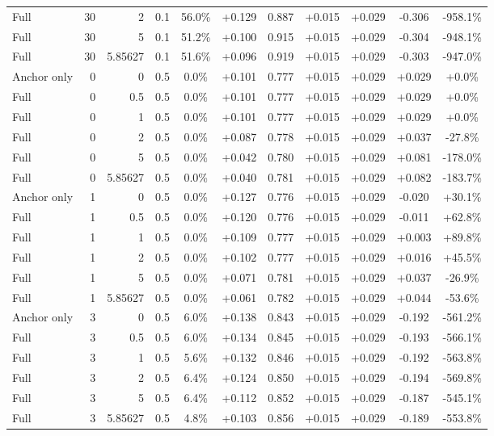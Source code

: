 \begin{table}[htbp]
\begin{tabular}{lrrrccccccc}
Full & 30 & 2 & 0.1 & 56.0\% & +0.129 & 0.887 & +0.015 & +0.029 & -0.306 & -958.1\% \\
Full & 30 & 5 & 0.1 & 51.2\% & +0.100 & 0.915 & +0.015 & +0.029 & -0.304 & -948.1\% \\
Full & 30 & 5.85627 & 0.1 & 51.6\% & +0.096 & 0.919 & +0.015 & +0.029 & -0.303 & -947.0\% \\
Anchor only & 0 & 0 & 0.5 & 0.0\% & +0.101 & 0.777 & +0.015 & +0.029 & +0.029 & +0.0\% \\
Full & 0 & 0.5 & 0.5 & 0.0\% & +0.101 & 0.777 & +0.015 & +0.029 & +0.029 & +0.0\% \\
Full & 0 & 1 & 0.5 & 0.0\% & +0.101 & 0.777 & +0.015 & +0.029 & +0.029 & +0.0\% \\
Full & 0 & 2 & 0.5 & 0.0\% & +0.087 & 0.778 & +0.015 & +0.029 & +0.037 & -27.8\% \\
Full & 0 & 5 & 0.5 & 0.0\% & +0.042 & 0.780 & +0.015 & +0.029 & +0.081 & -178.0\% \\
Full & 0 & 5.85627 & 0.5 & 0.0\% & +0.040 & 0.781 & +0.015 & +0.029 & +0.082 & -183.7\% \\
Anchor only & 1 & 0 & 0.5 & 0.0\% & +0.127 & 0.776 & +0.015 & +0.029 & -0.020 & +30.1\% \\
Full & 1 & 0.5 & 0.5 & 0.0\% & +0.120 & 0.776 & +0.015 & +0.029 & -0.011 & +62.8\% \\
Full & 1 & 1 & 0.5 & 0.0\% & +0.109 & 0.777 & +0.015 & +0.029 & +0.003 & +89.8\% \\
Full & 1 & 2 & 0.5 & 0.0\% & +0.102 & 0.777 & +0.015 & +0.029 & +0.016 & +45.5\% \\
Full & 1 & 5 & 0.5 & 0.0\% & +0.071 & 0.781 & +0.015 & +0.029 & +0.037 & -26.9\% \\
Full & 1 & 5.85627 & 0.5 & 0.0\% & +0.061 & 0.782 & +0.015 & +0.029 & +0.044 & -53.6\% \\
Anchor only & 3 & 0 & 0.5 & 6.0\% & +0.138 & 0.843 & +0.015 & +0.029 & -0.192 & -561.2\% \\
Full & 3 & 0.5 & 0.5 & 6.0\% & +0.134 & 0.845 & +0.015 & +0.029 & -0.193 & -566.1\% \\
Full & 3 & 1 & 0.5 & 5.6\% & +0.132 & 0.846 & +0.015 & +0.029 & -0.192 & -563.8\% \\
Full & 3 & 2 & 0.5 & 6.4\% & +0.124 & 0.850 & +0.015 & +0.029 & -0.194 & -569.8\% \\
Full & 3 & 5 & 0.5 & 6.4\% & +0.112 & 0.852 & +0.015 & +0.029 & -0.187 & -545.1\% \\
Full & 3 & 5.85627 & 0.5 & 4.8\% & +0.103 & 0.856 & +0.015 & +0.029 & -0.189 & -553.8\% \\

\end{tabular}
\end{table}
